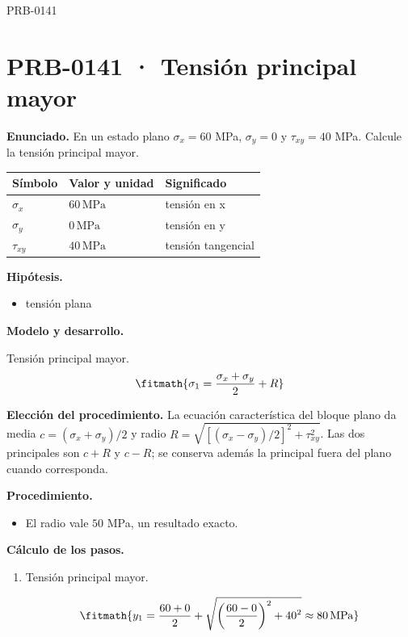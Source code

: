 \begin{studiumworked}{PRB-0141}

\section{PRB-0141 · Tensión principal mayor}

\textbf{Enunciado.} En un estado plano $\sigma_x = 60$ MPa, $\sigma_y = 0$ y $\tau_{xy} = 40$ MPa. Calcule la tensión principal mayor.

\par\medskip\noindent\begin{tabular}{@{}p{.18\linewidth}p{.26\linewidth}p{.48\linewidth}@{}}
\toprule Símbolo & Valor y unidad & Significado\\\midrule
$\sigma_{x}$ & $60\,\mathrm{MPa}$ & tensión en x\\
$\sigma_{y}$ & $0\,\mathrm{MPa}$ & tensión en y\\
$\tau_{xy}$ & $40\,\mathrm{MPa}$ & tensión tangencial\\
\bottomrule\end{tabular}\par\medskip

\textbf{Hipótesis.}\begin{itemize}\item tensión plana\end{itemize}

\textbf{Modelo y desarrollo.}

Tensión principal mayor.\[\fitmath{\sigma_1 = \frac{\sigma_x + \sigma_y}{2} + R}\]

\textbf{Elección del procedimiento.} La ecuación característica del bloque plano da media $c=(\sigma_x+\sigma_y)/2$ y radio $R=\sqrt{[(\sigma_x-\sigma_y)/2]^2+\tau_{xy}^2}$. Las dos principales son $c+R$ y $c-R$; se conserva además la principal fuera del plano cuando corresponda.

\textbf{Procedimiento.}\begin{itemize}\item El radio vale $50$ MPa, un resultado exacto.\end{itemize}

\textbf{Cálculo de los pasos.}

\begin{enumerate}

\item Tensión principal mayor.

\[\fitmath{y_{1}=\frac{60+0}{2}+\sqrt{{\left(\frac{60-0}{2}\right)}^{2}+{40}^{2}}\approx 80\,\mathrm{MPa}}\]


\end{enumerate}
\end{studiumworked}
